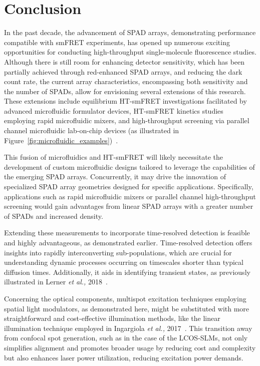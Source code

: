 \chapter{Conclusion}
\label{chpt:conclusion}

In the past decade, the advancement of \ac{SPAD} arrays, demonstrating performance compatible with \ac{smFRET} experiments, has opened up numerous exciting opportunities for conducting high-throughput single-molecule fluorescence studies. 
Although there is still room for enhancing detector sensitivity, which has been partially achieved through red-enhanced \ac{SPAD} arrays, and reducing the dark count rate, the current array characteristics, encompassing both sensitivity and the number of \ac{SPAD}s, allow for envisioning several extensions of this research. 
These extensions include equilibrium \ac{HT-smFRET} investigations facilitated by advanced microfluidic formulator devices, \ac{HT-smFRET} kinetics studies employing rapid microfluidic mixers, and high-throughput screening via parallel channel microfluidic lab-on-chip devices (as illustrated in Figure~\ref{fig:microfluidic_examples})~\cite{streets_COB_2014,yeh_SA_2017}.

This fusion of microfluidics and \ac{HT-smFRET} will likely necessitate the development of custom microfluidic designs tailored to leverage the capabilities of the emerging \ac{SPAD} arrays. 
Concurrently, it may drive the innovation of specialized \ac{SPAD} array geometries designed for specific applications. 
Specifically, applications such as rapid microfluidic mixers or parallel channel high-throughput screening would gain advantages from linear \ac{SPAD} arrays with a greater number of \ac{SPAD}s and increased density.

Extending these measurements to incorporate time-resolved detection is feasible and highly advantageous, as demonstrated earlier. 
Time-resolved detection offers insights into rapidly interconverting sub-populations, which are crucial for understanding dynamic processes occurring on timescales shorter than typical diffusion times. 
Additionally, it aids in identifying transient states, as previously illustrated in Lerner \textit{et al.,} 2018~\cite{lerner_Science_2018}.

Concerning the optical components, multispot excitation techniques employing spatial light modulators, as demonstrated here, might be substituted with more straightforward and cost-effective illumination methods, like the linear illumination technique employed in Ingargiola \textit{et al.,} 2017~\cite{ingargiola_SPIE_2017}. 
This transition away from confocal spot generation, such as in the case of the \ac{LCOS-SLM}s, not only simplifies alignment and promotes broader usage by reducing cost and complexity but also enhances laser power utilization, reducing excitation power demands.

